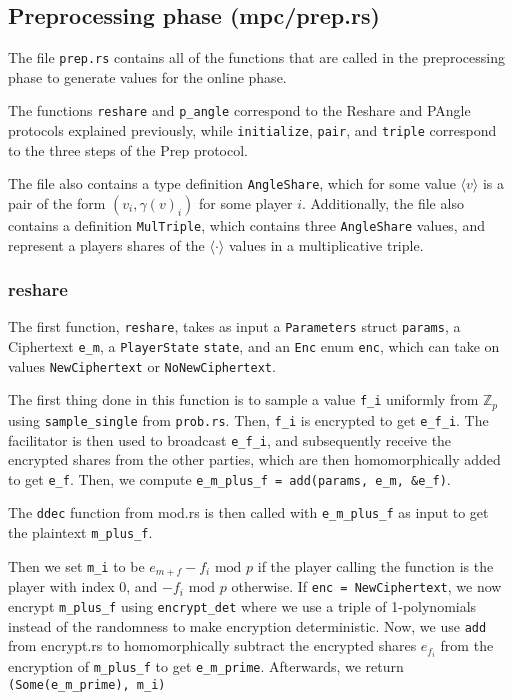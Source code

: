 \documentclass[../main.tex]{subfiles}
\begin{document}
\subsection{Preprocessing phase (mpc/prep.rs)}
The file \lstinline{prep.rs} contains all of the functions that are called in the preprocessing phase to generate values for the online phase.

The functions \lstinline{reshare} and \lstinline{p_angle} correspond to the Reshare and PAngle protocols explained previously, while \lstinline{initialize}, \lstinline{pair}, and \lstinline{triple} correspond to the three steps of the Prep protocol.

The file also contains a type definition \lstinline{AngleShare}, which for some value $\langle v \rangle$ is a pair of the form $(v_i, \gamma(v)_i)$ for some player $i$. Additionally, the file also contains a definition \lstinline{MulTriple}, which contains three \lstinline{AngleShare} values, and represent a players shares of the $\langle \cdot \rangle$ values in a multiplicative triple. %

\subsubsection{reshare}
The first function, \lstinline{reshare}, takes as input a \lstinline{Parameters} struct \lstinline{params}, a Ciphertext \lstinline{e_m}, a  \lstinline{PlayerState} \lstinline{state}, and an \lstinline{Enc} enum \lstinline{enc}, which can take on values \lstinline{NewCiphertext} or \lstinline{NoNewCiphertext}.

The first thing done in this function is to sample a value \lstinline{f_i} uniformly from $\mathbb{Z}_p$ using \lstinline{sample_single} from \lstinline{prob.rs}. Then, \lstinline{f_i} is encrypted to get \lstinline{e_f_i}.
The facilitator is then used to broadcast \lstinline{e_f_i}, and subsequently receive the encrypted shares from the other parties, which are then homomorphically added to get \lstinline{e_f}. Then, we compute \lstinline{e_m_plus_f = add(params, e_m, &e_f)}.

The \lstinline{ddec} function from mod.rs is then called with \lstinline{e_m_plus_f} as input to get the plaintext \lstinline{m_plus_f}.

Then we set \lstinline{m_i} to be $e_{m + f} - f_i \text{ mod } p$ if the player calling the function is the player with index $0$, and $- f_i \text{ mod } p$ otherwise. If \lstinline{enc = NewCiphertext}, we now encrypt \lstinline{m_plus_f} using \lstinline{encrypt_det} where we use a triple of 1-polynomials instead of the randomness to make encryption deterministic. Now, we use \lstinline{add} from encrypt.rs to homomorphically subtract the encrypted shares $e_{f_i}$ from the encryption of \lstinline{m_plus_f} to get \lstinline{e_m_prime}. Afterwards, we return \lstinline{(Some(e_m_prime), m_i)}
\end{document}
